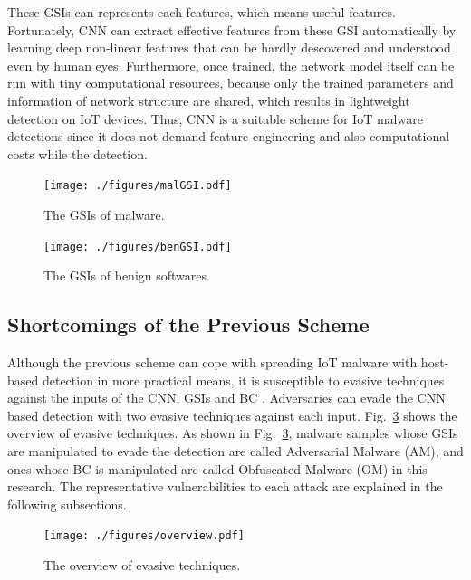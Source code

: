 \documentclass{ieeeaccess}
\newcommand{\myfigurename}{Fig.}
\begin{document}
These GSIs can represents each features, which means useful features.
Fortunately, CNN can extract effective features from these GSI automatically by learning deep non-linear features that can be hardly descovered and understood even by human eyes.
Furthermore, once trained, the network model itself can be run with tiny computational resources, because only the trained parameters and information of network structure are shared, which results in lightweight detection on IoT devices.
Thus, CNN is a suitable scheme for IoT malware detections since it does not demand feature engineering and also computational costs while the detection.

\begin{figure}[t]
 \centering
 \texttt{[image: ./figures/malGSI.pdf]}
 \caption{The GSIs of malware.} 
 \label{fig:malGSI}
\end{figure}
\begin{figure}[t]
 \centering
 \texttt{[image: ./figures/benGSI.pdf]}
 \caption{The GSIs of benign softwares.} 
 \label{fig:benGSI}
\end{figure}

\subsection{Shortcomings of the Previous Scheme}
Although the previous scheme can cope with spreading IoT malware with host-based detection in more practical means, it is susceptible to evasive techniques against the inputs of the CNN, GSIs and BC \cite{attack1, attack2}.
Adversaries can evade the CNN based detection with two evasive techniques against each input.
\myfigurename~\ref{fig:ov} shows the overview of evasive techniques.
As shown in \myfigurename~\ref{fig:ov}, malware samples whose GSIs are manipulated to evade the detection are called Adversarial Malware (AM), and ones whose BC is manipulated are called Obfuscated Malware (OM) in this research.
The representative vulnerabilities to each attack are explained in the following subsections.

\begin{figure}[t]
 \centering
 \texttt{[image: ./figures/overview.pdf]}
 \caption{The overview of evasive techniques.} 
 \label{fig:ov}
\end{figure}
\end{document}
